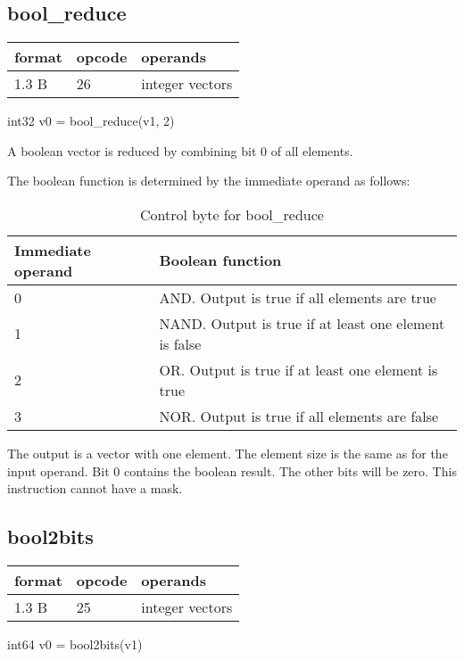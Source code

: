 \documentclass[forwardcom.tex]{subfiles}
\begin{document}
\subsection{bool\_reduce}
\label{table:boolReduceInstruction}
\begin{tabular}{|p{12mm}|p{15mm}|p{100mm}|}
\hline
\bfseries format & \bfseries opcode & \bfseries operands \\ \hline
1.3 B & 26 & integer vectors \\ \hline
\end{tabular}
\vv

int32 v0 = bool\_reduce(v1, 2)
\vv

A boolean vector is reduced by combining bit 0 of all elements.
\vv

The boolean function is determined by the immediate operand as follows:
\begin{longtable} {|p{20mm}|p{75mm}|}
\caption{Control byte for bool\_reduce} 
\label{table:ControlByteForBoolReduce} \\
\endfirsthead
\endhead
\hline
\bfseries Immediate operand & \bfseries Boolean function  \\
\hline
0 & AND. Output is true if all elements are true \\
\hline
1 & NAND. Output is true if at least one element is false \\
\hline
2 & OR. Output is true if at least one element is true \\
\hline
3 & NOR. Output is true if all elements are false \\
\hline
\end{longtable}

The output is a vector with one element. The element size is the same as for the input operand. Bit 0 contains the boolean result. The other bits will be zero. 
This instruction cannot have a mask.
\vv


\subsection{bool2bits}
\label{table:bool2bitsInstruction}
\begin{tabular}{|p{12mm}|p{15mm}|p{100mm}|}
\hline
\bfseries format & \bfseries opcode & \bfseries operands \\ \hline
1.3 B & 25 & integer vectors \\ \hline
\end{tabular}
\vv

int64 v0 = bool2bits(v1)
\vv
\end{document}
